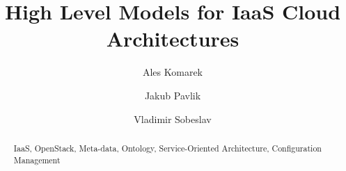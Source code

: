 \documentclass[runningheads,a4paper]{llncs}
\newcommand{\keywords}[1]{\par\addvspace\baselineskip
\noindent\keywordname\enspace\ignorespaces#1}
\begin{document}
\mainmatter  %

\title{High Level Models for IaaS Cloud Architectures}


%
%
\author{Ales Komarek\and Jakub Pavlik\and Vladimir Sobeslav}
%


\institute{Faculty of Informatics and Management, University of Hradec Kralove,\\
Rokitanskeho 62, Hradec Kralove, Czech Republic\\
\mailsa\\
}
%
%

\maketitle

\begin{abstract}

\keywords{IaaS, OpenStack, Meta-data, Ontology, Service-Oriented Architecture, Configuration Management}

\end{abstract}



%




\begin{thebibliography}{4}



\end{thebibliography}
\end{document}
